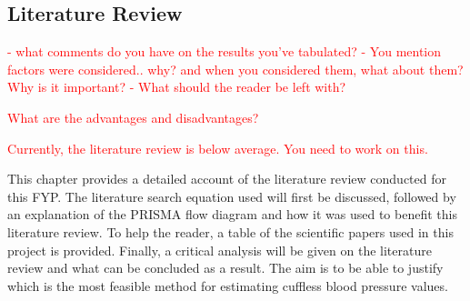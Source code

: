 \subsection{Literature Review}

\textcolor{red}{- what comments do you have on the results you've tabulated?}
\textcolor{red}{- You mention factors were considered.. why? and when you considered them, what about them? Why is it important?}
\textcolor{red}{- What should the reader be left with?}

\textcolor{red}{What are the advantages and disadvantages?}

\textcolor{red}{Currently, the literature review is below average. You need to work on this.}

This chapter provides a detailed account of the literature review conducted for this FYP. 
The literature search equation used will first be discussed, followed by an explanation of the PRISMA 
flow diagram and how it was used to benefit this literature review. To help the reader, 
a table of the scientific papers used in this project is provided. Finally, a critical analysis 
will be given on the literature review and what can be concluded as a result. The aim is to be 
able to justify which is the most feasible method for estimating cuffless blood pressure values.

